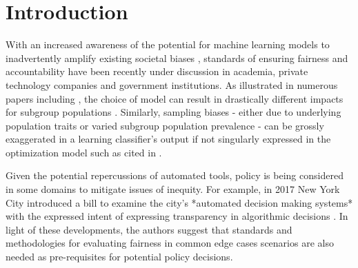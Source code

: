 \section{Introduction}

With an increased awareness of the potential for machine learning models to inadvertently amplify existing societal biases \cite{BolukbasiCZSK16a}, standards of ensuring fairness and accountability have been recently under discussion in academia, private technology companies and government institutions.  As illustrated in numerous papers including \cite{Liu2018}, the choice of model can result in drastically different impacts for subgroup populations \cite{Burke2017MultisidedFF}.  Similarly, sampling biases - either due to underlying population traits or varied subgroup population prevalence - can be grossly exaggerated in a learning classifier's output if not singularly expressed in the optimization model such as cited in \cite{Zhao2017MenAL}.
\par
Given the potential repercussions of automated tools, policy is being considered in some domains to mitigate issues of inequity. For example, in 2017 New York City introduced a bill to examine the city's *automated decision making systems* with the expressed intent of expressing transparency in algorithmic decisions \cite{NYCLaw}.  In light of these developments, the authors suggest that standards and methodologies for evaluating fairness in common edge cases scenarios are also needed as pre-requisites for potential policy decisions\cite{Adler2018, Ribeiro2016, Feldman2014}.   
\par

